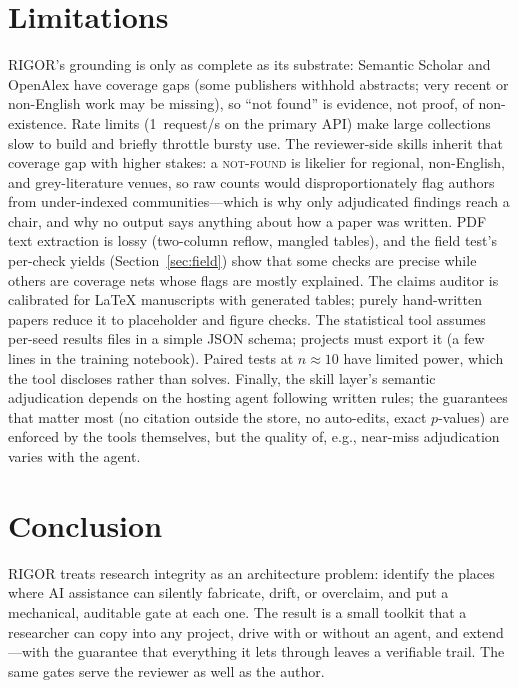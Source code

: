 \documentclass[11pt]{article}
\begin{document}
\section{Limitations}

RIGOR's grounding is only as complete as its substrate: Semantic Scholar and
OpenAlex have coverage gaps (some publishers withhold abstracts; very recent
or non-English work may be missing), so ``not found'' is evidence, not proof,
of non-existence. Rate limits (1~request/s on the primary API) make large
collections slow to build and briefly throttle bursty use.
The reviewer-side skills inherit that coverage gap with higher stakes: a
\textsc{not-found} is likelier for regional, non-English, and grey-literature
venues, so raw counts would disproportionately flag authors from
under-indexed communities---which is why only adjudicated findings reach a
chair, and why no output says anything about how a paper was written. PDF
text extraction is lossy (two-column reflow, mangled tables), and the field
test's per-check yields (Section~\ref{sec:field}) show that some checks are
precise while others are coverage nets whose flags are mostly explained.
The claims auditor is calibrated for LaTeX manuscripts with generated tables;
purely hand-written papers reduce it to placeholder and figure checks. The
statistical tool assumes per-seed results files in a simple JSON schema;
projects must export it (a few lines in the training notebook). Paired tests
at $n{\approx}10$ have limited power, which the tool discloses rather than
solves. Finally, the skill layer's semantic adjudication depends on the
hosting agent following written rules; the guarantees that matter most
(no citation outside the store, no auto-edits, exact $p$-values) are enforced
by the tools themselves, but the quality of, e.g., near-miss adjudication
varies with the agent.

\section{Conclusion}

RIGOR treats research integrity as an architecture problem: identify the
places where AI assistance can silently fabricate, drift, or overclaim, and
put a mechanical, auditable gate at each one. The result is a small toolkit
that a researcher can copy into any project, drive with or without an agent,
and extend---with the guarantee that everything it lets through leaves a
verifiable trail. The same gates serve the reviewer as well as the author.
\end{document}
